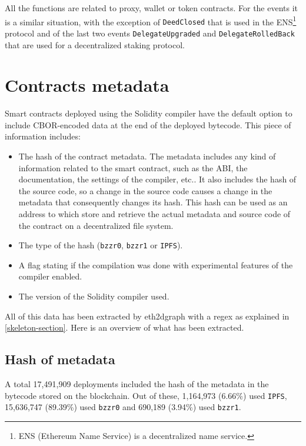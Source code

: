All the functions are related to proxy, wallet or token contracts. For the events it is a similar situation, with the exception of {\tt DeedClosed} that is used in the ENS\footnote{ENS (Ethereum Name Service) is a decentralized name service.} protocol and of the last two events {\tt DelegateUpgraded} and {\tt DelegateRolledBack} that are used for a decentralized staking protocol.

\newpage

\section{Contracts metadata}

Smart contracts deployed using the Solidity compiler have the default option to include CBOR-encoded data at the end of the deployed bytecode. This piece of information includes:

\begin{itemize}
    \item The hash of the contract metadata. The metadata includes any kind of information related to the smart contract, such as the ABI, the documentation, the settings of the compiler, etc.. It also includes the hash of the source code, so a change in the source code causes a change in the metadata that consequently changes its hash. This hash can be used as an address to which store and retrieve the actual metadata and source code of the contract on a decentralized file system.
    \item The type of the hash ({\tt bzzr0}, {\tt bzzr1} or {\tt IPFS}).
    \item A flag stating if the compilation was done with experimental features of the compiler enabled.
    \item The version of the Solidity compiler used.
\end{itemize}

All of this data has been extracted by eth2dgraph with a regex as explained in \cref{skeleton-section}. Here is an overview of what has been extracted.

\subsection{Hash of metadata}

A total 17,491,909 deployments included the hash of the metadata in the bytecode stored on the blockchain. Out of these, 1,164,973 (6.66\%) used {\tt IPFS}, 15,636,747 (89.39\%) used {\tt bzzr0} and 690,189 (3.94\%) used {\tt bzzr1}. 

